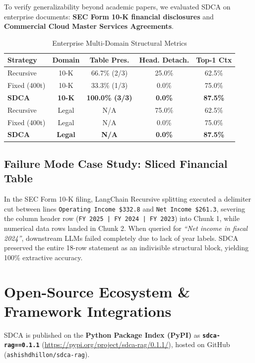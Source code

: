 \documentclass[conference]{IEEEtran}
\begin{document}
To verify generalizability beyond academic papers, we evaluated SDCA on enterprise documents: \textbf{SEC Form 10-K financial disclosures} and \textbf{Commercial Cloud Master Services Agreements}.

\begin{table}[h]
\centering
\caption{Enterprise Multi-Domain Structural Metrics}
\label{tab:enterprise}
\begin{tabular}{lcccc}
\toprule
\textbf{Strategy} & \textbf{Domain} & \textbf{Table Pres.} & \textbf{Head. Detach.} & \textbf{Top-1 Ctx} \\
\midrule
Recursive & 10-K & 66.7\% (2/3) & 25.0\% & 62.5\% \\
Fixed (400t) & 10-K & 33.3\% (1/3) & 0.0\% & 75.0\% \\
\textbf{SDCA} & \textbf{10-K} & \textbf{100.0\% (3/3)} & \textbf{0.0\%} & \textbf{87.5\%} \\
\midrule
Recursive & Legal & N/A & 75.0\% & 62.5\% \\
Fixed (400t) & Legal & N/A & 0.0\% & 75.0\% \\
\textbf{SDCA} & \textbf{Legal} & \textbf{N/A} & \textbf{0.0\%} & \textbf{87.5\%} \\
\bottomrule
\end{tabular}
\end{table}

\subsection{Failure Mode Case Study: Sliced Financial Table}
In the SEC Form 10-K filing, LangChain Recursive splitting executed a delimiter cut between lines \texttt{Operating Income \$332.8} and \texttt{Net Income \$261.3}, severing the column header row (\texttt{FY 2025 | FY 2024 | FY 2023}) into Chunk 1, while numerical data rows landed in Chunk 2. When queried for \textit{``Net income in fiscal 2024''}, downstream LLMs failed completely due to lack of year labels. SDCA preserved the entire 18-row statement as an indivisible structural block, yielding 100\% extractive accuracy.

\section{Open-Source Ecosystem \& Framework Integrations}

SDCA is published on the \textbf{Python Package Index (PyPI)} as \textbf{\texttt{sdca-rag==0.1.1}} (\url{https://pypi.org/project/sdca-rag/0.1.1/}), hosted on GitHub (\texttt{ashishdhillon/sdca-rag}).
\end{document}
